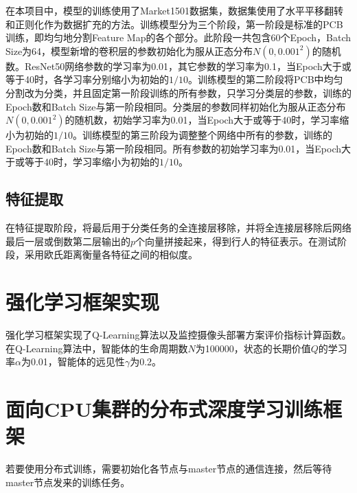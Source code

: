 在本项目中，模型的训练使用了Market1501\cite{zheng2015scalable}数据集，数据集使用了水平平移翻转和正则化作为数据扩充的方法。训练模型分为三个阶段，第一阶段是标准的PCB训练，即均匀地分割Feature Map的各个部分。此阶段一共包含60个Epoch，Batch Size为64，模型新增的卷积层的参数初始化为服从正态分布$N(0, 0.001^2)$的随机数。ResNet50网络参数的学习率为0.01，其它参数的学习率为0.1，当Epoch大于或等于40时，各学习率分别缩小为初始的$1/10$。训练模型的第二阶段将PCB中均匀分割改为分类，并且固定第一阶段训练的所有参数，只学习分类层的参数，训练的Epoch数和Batch Size与第一阶段相同。分类层的参数同样初始化为服从正态分布$N(0, 0.001^2)$的随机数，初始学习率为0.01，当Epoch大于或等于40时，学习率缩小为初始的$1/10$。训练模型的第三阶段为调整整个网络中所有的参数，训练的Epoch数和Batch Size与第一阶段相同。所有参数的初始学习率为0.01，当Epoch大于或等于40时，学习率缩小为初始的$1/10$。

\subsection{特征提取}

在特征提取阶段，将最后用于分类任务的全连接层移除，并将全连接层移除后网络最后一层或倒数第二层输出的$p$个向量拼接起来，得到行人的特征表示。在测试阶段，采用欧氏距离衡量各特征之间的相似度。

\section{强化学习框架实现}

强化学习框架实现了Q-Learning算法以及监控摄像头部署方案评价指标计算函数。在Q-Learning算法中，智能体的生命周期数$N$为100000，状态的长期价值$Q$的学习率$\alpha$为0.01，智能体的远见性$\gamma$为0.2。

\section{面向CPU集群的分布式深度学习训练框架}

若要使用分布式训练，需要初始化各节点与master节点的通信连接，然后等待master节点发来的训练任务。